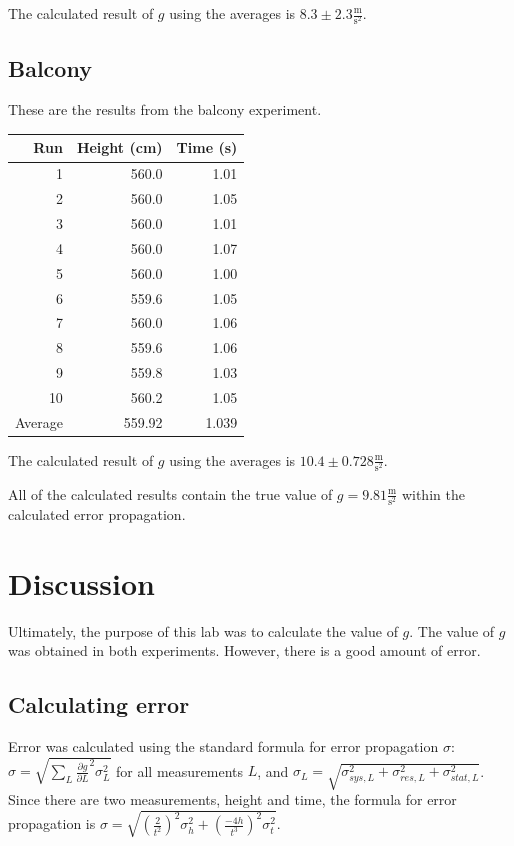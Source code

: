 \documentclass[12pt]{article}
\begin{document}
The calculated result of \(g\) using the averages is \(8.3\pm2.3 \frac{\text{m}}{\text{s}^{2}}\).
\subsection{Balcony}
\label{sec:orge43ca36}

These are the results from the balcony experiment.

\begin{center}
\begin{tabular}{r|r|r}
Run & Height (cm) & Time (s)\\
\hline
1 & 560.0 & 1.01\\
2 & 560.0 & 1.05\\
3 & 560.0 & 1.01\\
4 & 560.0 & 1.07\\
5 & 560.0 & 1.00\\
6 & 559.6 & 1.05\\
7 & 560.0 & 1.06\\
8 & 559.6 & 1.06\\
9 & 559.8 & 1.03\\
10 & 560.2 & 1.05\\
\hline
Average & 559.92 & 1.039\\
\end{tabular}
\end{center}

The calculated result of \(g\) using the averages is \(10.4\pm 0.728 \frac{\text{m}}{\text{s}^{2}}\).

All of the calculated results contain the true value of \(g = 9.81 \frac{\text{m}}{\text{s}^{2}}\) within the calculated error propagation.
\section{Discussion}
\label{sec:org0689cd2}

Ultimately, the purpose of this lab was to calculate the value of \(g\). The value of \(g\) was obtained in both experiments. However, there is a good amount of error.
\subsection{Calculating error}
\label{sec:orgcdaf297}

Error was calculated using the standard formula for error propagation \(\sigma\): \(\sigma = \sqrt{\sum_{L} \frac{\partial g}{\partial L}^{2}\sigma_{L}^{2}}\) for all measurements \(L\), and \(\sigma_{L}=\sqrt{\sigma_{sys,L}^{2}+\sigma_{res,L}^{2}+\sigma_{stat,L}^{2}}\). Since there are two measurements, height and time, the formula for error propagation is \(\sigma = \sqrt{ \left( \frac{2}{t^{2}} \right) ^{2} \sigma_{h}^{2} + \left( \frac{-4h}{t^{3}} \right)^{2}\sigma_{t}^{2} }\).
\end{document}
